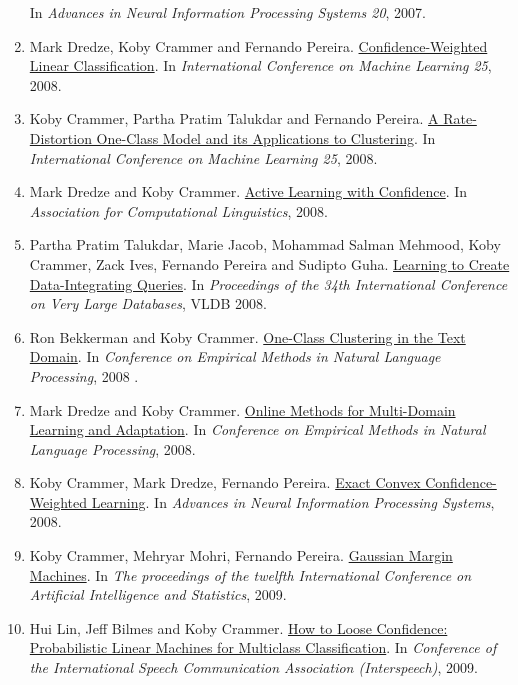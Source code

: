 \documentclass{resume}
\begin{document}
\begin{enumerate}
In {\em Advances in Neural Information Processing Systems 20}, 2007.
\item
Mark Dredze, {Koby Crammer} and Fernando Pereira.
\href{http://www.cis.upenn.edu/~crammer/publications/icml08_variance.pdf}{Confidence-Weighted Linear Classification}.
In {\em International Conference on Machine Learning 25}, 2008.
\item
{Koby Crammer}, Partha Pratim Talukdar and Fernando Pereira.
\href{http://www.cis.upenn.edu/~crammer/publications/icml08_ocrd.pdf}{A Rate-Distortion One-Class Model and its Applications to
  Clustering}.
In {\em International Conference on Machine Learning 25}, 2008.
\item
Mark Dredze and {Koby Crammer}.
\href{http://www.cis.upenn.edu/~crammer/publications/acl08_active_conf.pdf}{Active Learning with Confidence}.
In {\em Association for Computational Linguistics}, 2008.
\item
Partha Pratim Talukdar, Marie Jacob, Mohammad Salman Mehmood, {Koby Crammer}, Zack Ives, Fernando Pereira and Sudipto Guha.
\href{http://www.cis.upenn.edu/~crammer/publications/vldb08_kbdi.pdf}{Learning to Create Data-Integrating Queries}.
In {\em Proceedings of the 34th International Conference on Very Large Databases}, VLDB 2008.
\item
Ron Bekkerman and {Koby Crammer}.
\href{http://www.cis.upenn.edu/~crammer/publications/multi_domain_emnlp08.pdf}{One-Class Clustering in the Text Domain}.
In {\em Conference on Empirical Methods in Natural Language Processing}, 2008 .
\item
Mark Dredze and {Koby Crammer}.
\href{http://www.cis.upenn.edu/~crammer/publications/oc_emnlp08.pdf}{Online Methods for Multi-Domain Learning and Adaptation}.
In {\em Conference on Empirical Methods in Natural Language Processing}, 2008.
\item
{Koby Crammer}, Mark Dredze, Fernando Pereira.
\href{http://www.cis.upenn.edu/~crammer/publications/paper_nips08_std.pdf}{Exact Convex Confidence-Weighted Learning}.
In {\em Advances in Neural Information Processing Systems}, 2008.
\item
{Koby Crammer}, Mehryar Mohri, Fernando Pereira.
\href{http://www.cis.upenn.edu/~crammer/publications/gmms.pdf}{Gaussian Margin Machines}.
In {\em The proceedings of the twelfth International Conference on
Artificial Intelligence and Statistics}, 2009.
\item
Hui Lin, Jeff Bilmes and {Koby Crammer}.
\href{http://www.cis.upenn.edu/~crammer/publications/lp_is09.pdf}{How to Loose Confidence: Probabilistic Linear Machines for Multiclass Classification}.
In {\em Conference of the International Speech Communication Association (Interspeech)}, 2009.


\end{enumerate}
\end{document}
